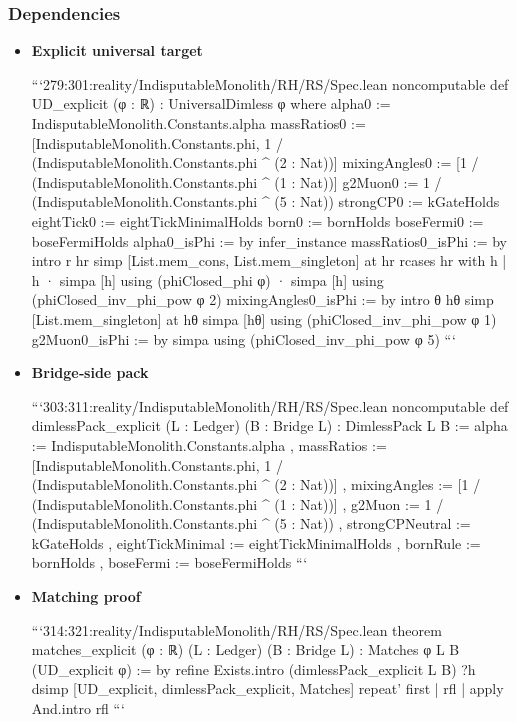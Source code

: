 \documentclass{article}
\begin{document}
\subsubsection{Dependencies}
\begin{itemize}[leftmargin=*]
  \item \textbf{Explicit universal target}

```279:301:reality/IndisputableMonolith/RH/RS/Spec.lean
noncomputable def UD_explicit (φ : ℝ) : UniversalDimless φ where
  alpha0 := IndisputableMonolith.Constants.alpha
  massRatios0 := [IndisputableMonolith.Constants.phi, 1 / (IndisputableMonolith.Constants.phi ^ (2 : Nat))]
  mixingAngles0 := [1 / (IndisputableMonolith.Constants.phi ^ (1 : Nat))]
  g2Muon0 := 1 / (IndisputableMonolith.Constants.phi ^ (5 : Nat))
  strongCP0 := kGateHolds
  eightTick0 := eightTickMinimalHolds
  born0 := bornHolds
  boseFermi0 := boseFermiHolds
  alpha0_isPhi := by infer_instance
  massRatios0_isPhi := by
    intro r hr
    simp [List.mem_cons, List.mem_singleton] at hr
    rcases hr with h | h
    · simpa [h] using (phiClosed_phi φ)
    · simpa [h] using (phiClosed_inv_phi_pow φ 2)
  mixingAngles0_isPhi := by
    intro θ hθ
    simp [List.mem_singleton] at hθ
    simpa [hθ] using (phiClosed_inv_phi_pow φ 1)
  g2Muon0_isPhi := by
    simpa using (phiClosed_inv_phi_pow φ 5)
```

  \item \textbf{Bridge‑side pack}

```303:311:reality/IndisputableMonolith/RH/RS/Spec.lean
noncomputable def dimlessPack_explicit (L : Ledger) (B : Bridge L) : DimlessPack L B :=
{ alpha := IndisputableMonolith.Constants.alpha
, massRatios := [IndisputableMonolith.Constants.phi, 1 / (IndisputableMonolith.Constants.phi ^ (2 : Nat))]
, mixingAngles := [1 / (IndisputableMonolith.Constants.phi ^ (1 : Nat))]
, g2Muon := 1 / (IndisputableMonolith.Constants.phi ^ (5 : Nat))
, strongCPNeutral := kGateHolds
, eightTickMinimal := eightTickMinimalHolds
, bornRule := bornHolds
, boseFermi := boseFermiHolds }
```

  \item \textbf{Matching proof}

```314:321:reality/IndisputableMonolith/RH/RS/Spec.lean
theorem matches_explicit (φ : ℝ) (L : Ledger) (B : Bridge L) :
  Matches φ L B (UD_explicit φ) := by
  refine Exists.intro (dimlessPack_explicit L B) ?h
  dsimp [UD_explicit, dimlessPack_explicit, Matches]
  repeat' first
    | rfl
    | apply And.intro rfl
```
\end{itemize}
\end{document}
